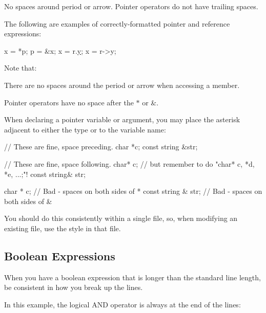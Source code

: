 No spaces around period or arrow. Pointer operators do not have trailing spaces.

The following are examples of correctly-\/formatted pointer and reference expressions\+:


\begin{DoxyCode}
x = *p;
p = &x;
x = r.\hyperlink{classVec2_a30543787e62f6d915543cf1dfb04c094}{y};
x = r->y;
\end{DoxyCode}


Note that\+:


\begin{DoxyItemize}
\item There are no spaces around the period or arrow when accessing a member.
\item Pointer operators have no space after the $\ast$ or \&.
\end{DoxyItemize}

When declaring a pointer variable or argument, you may place the asterisk adjacent to either the type or to the variable name\+:


\begin{DoxyCode}
\textcolor{comment}{// These are fine, space preceding.}
\textcolor{keywordtype}{char} *c;
\textcolor{keyword}{const} \textcolor{keywordtype}{string} &str;

\textcolor{comment}{// These are fine, space following.}
\textcolor{keywordtype}{char}* c;    \textcolor{comment}{// but remember to do "char* c, *d, *e, ...;"!}
\textcolor{keyword}{const} \textcolor{keywordtype}{string}& str;

\textcolor{keywordtype}{char} * c;  \textcolor{comment}{// Bad - spaces on both sides of *}
\textcolor{keyword}{const} \textcolor{keywordtype}{string} & str;  \textcolor{comment}{// Bad - spaces on both sides of &}
\end{DoxyCode}


You should do this consistently within a single file, so, when modifying an existing file, use the style in that file.

\subsection*{Boolean Expressions}

When you have a boolean expression that is longer than the standard line length, be consistent in how you break up the lines.

In this example, the logical A\+ND operator is always at the end of the lines\+:



